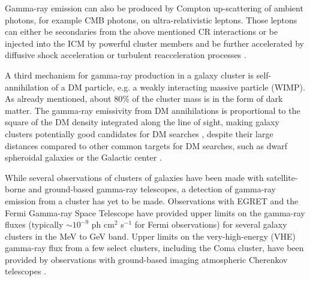 \documentclass[12pt,manuscript]{aastex}
\begin{document}
Gamma-ray emission can also be produced by Compton up-scattering of ambient photons, for example
CMB photons, on ultra-relativistic leptons. Those leptons can either be secondaries from the above
mentioned CR interactions or be injected into the ICM by powerful cluster members and be further
accelerated by diffusive shock acceleration or turbulent reacceleration processes
\citep[][and references therein]{article:SchlickeiserSieversThiemann:1987}.

A third mechanism for gamma-ray production in a galaxy cluster is self-annihilation of a DM
particle, e.g. a weakly interacting massive particle (WIMP). As already mentioned, about 80\% of
the cluster mass is in the form of dark matter. The gamma-ray emissivity from DM annihilations is
proportional to the square of the DM density integrated along the line of sight, making galaxy clusters
potentially good candidates for DM searches \citep{article:EvansFerrerSarkar:2004,
article:BergstromHooper:2006, article:PinzkePfrommerBergstrom2009, article:Cuesta_etal:2011},
despite their large distances compared to other common targets for DM searches, such as dwarf
spheroidal galaxies \citep{article:Strigari_etal:2007, article:Acciari_etal:2010,article:Aliu_etal:2009}
or the Galactic center \citep{article:Kosack_etal:2004, article:Aharonian_etal:2006,
article:Aharonian_etal:2009b}.

While several observations of clusters of galaxies have been made with satellite-borne and
ground-based gamma-ray telescopes, a detection of gamma-ray emission from a cluster has yet to be
made. Observations with EGRET \citep{article:Sreekumar_etal:1996, article:Reimer_etal:2003} and the
Fermi Gamma-ray Space Telescope \citep{article:Ackermann_etal:2010} have provided upper limits on the
gamma-ray fluxes (typically $\sim10^{-9}$ ph cm$^{2}$ s$^{-1}$ for Fermi observations) for several
galaxy clusters in the MeV to GeV band. Upper limits on the very-high-energy (VHE) gamma-ray flux
from a few select clusters, including the Coma cluster, have been provided by observations with
ground-based imaging atmospheric Cherenkov telescopes \citep[IACTs;][]{article:Perkins_etal:2006,
inproc:Perkins_etal:2008, article:Aharonian_etal:2009a, article:Aleksic_etal:2010}.
\end{document}
